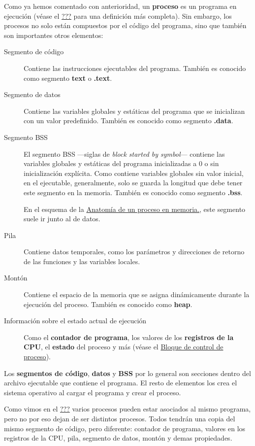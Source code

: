 Como ya hemos comentado con anterioridad, un \textbf{{}proceso} es un
programa en ejecución (véase el
\hyperref[sect-componente-gestion-de-procesos]{???} para una
definición más completa). Sin embargo, los procesos no solo están
compuestos por el código del programa, sino que también son importantes
otros elementos:

\begin{description}
\item[Segmento de código{}]
Contiene las instrucciones ejecutables del programa. También es conocido
como segmento \textbf{text}{} o \textbf{.text}.
\item[Segmento de datos{}]
Contiene las variables globales y estáticas del programa que se
inicializan con un valor predefinido. También es conocido como segmento
\textbf{.data}.
\item[Segmento BSS{}]
El segmento BSS ---siglas de \emph{block started by symbol}--- contiene
las variables globales y estáticas del programa inicializadas a 0 o sin
inicialización explícita. Como contiene variables globales sin valor
inicial, en el ejecutable, generalmente, solo se guarda la longitud que
debe tener este segmento en la memoria. También es conocido como
segmento \textbf{.bss}.

En el esquema de la \hyperref[fig-proceso-en-memoria]{Anatomía de un
proceso en memoria.}, este segmento suele ir junto al de datos.
\item[Pila{}]
Contiene datos temporales, como los parámetros y direcciones de retorno
de las funciones y las variables locales.
\item[Montón{}]
Contiene el espacio de la memoria que se asigna dinámicamente durante la
ejecución del proceso. También es conocido como \textbf{{}heap}.
\item[Información sobre el estado actual de ejecución]
Como el \textbf{contador de programa}, los valores de los
\textbf{registros de la CPU}, el \textbf{estado} del proceso y más
(véase el \hyperref[_bloque_de_control_de_proceso]{Bloque de control de
proceso}).
\end{description}

Los \textbf{segmentos de código}, \textbf{datos} y \textbf{BSS} por lo
general son secciones dentro del archivo ejecutable que contiene el
programa. El resto de elementos los crea el sistema operativo al cargar
el programa y crear el proceso.

Como vimos en el \hyperref[sect-componente-gestion-de-procesos]{???}
varios procesos pueden estar asociados al mismo programa, pero no por
eso dejan de ser distintos procesos. Todos tendrán una copia del mismo
segmento de código, pero diferente: contador de programa, valores en los
registros de la CPU, pila, segmento de datos, montón y demas
propiedades.

